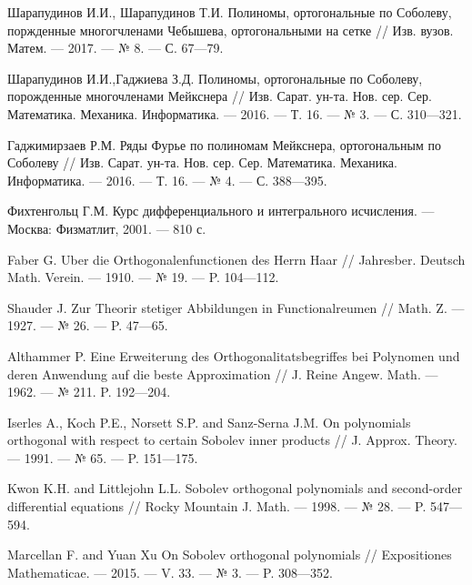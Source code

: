 \begin{thebibliography}{20}
Шарапудинов И.И., Шарапудинов Т.И. Полиномы, ортогональные по Соболеву, поржденные многогчленами Чебышева, ортогональными на сетке // Изв. вузов. Матем. --- 2017. --- № 8. --- С. 67---79.



Шарапудинов И.И.,Гаджиева  З.Д. Полиномы, ортогональные по Соболеву, порожденные многочленами Мейкснера // Изв. Сарат. ун-та. Нов. сер. Сер. Математика. Механика. Информатика. --- 2016. --- Т. 16. --- № 3. --- С. 310---321.



Гаджимирзаев Р.М. Ряды Фурье по полиномам Мейкснера, ортогональным по Соболеву // Изв. Сарат. ун-та. Нов. сер. Сер. Математика. Механика. Информатика. --- 2016. --- Т. 16. --- № 4. --- С. 388---395.



Фихтенгольц Г.М. Курс дифференциального и интегрального исчисления. --- Москва: Физматлит, 2001. --- 810 с.




Faber G. Uber die Orthogonalenfunctionen des Herrn Haar // Jahresber. Deutsch Math. Verein. --- 1910. --- № 19. --- P. 104---112.



Shauder J. Zur Theorir stetiger Abbildungen in Functionalreumen // Math. Z. --- 1927. --- № 26. --- P. 47---65.



Althammer P. Eine Erweiterung des Orthogonalitatsbegriffes bei Polynomen und deren Anwendung  auf die beste Approximation // J. Reine Angew. Math. --- 1962. --- № 211. P. 192---204.



Iserles A., Koch P.E., Norsett S.P. and Sanz-Serna J.M. On polynomials  orthogonal  with respect  to certain Sobolev inner products // J. Approx. Theory. --- 1991. --- № 65. --- P. 151---175.



Kwon K.H. and Littlejohn L.L. Sobolev orthogonal polynomials and second-order differential equations // Rocky Mountain J. Math. --- 1998. --- № 28. --- P. 547---594.



Marcellan F. and Yuan Xu On Sobolev orthogonal polynomials // Expositiones Mathematicae. --- 2015. --- V. 33. --- № 3. --- P. 308---352.




\end{thebibliography}
